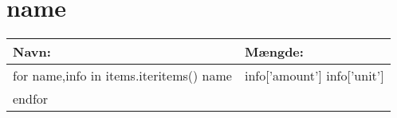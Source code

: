 \section*{ {{name}} }

\begin{tabular}{|l|l|}
  \hline
  \bf{Navn:} & \bf{Mængde:} \\
  \hline\hline
  {{for name,info in items.iteritems()}}
    {{name}} & {{info['amount']}} {{info['unit']}} \\
  {{endfor}}
  \hline
\end{tabular}
